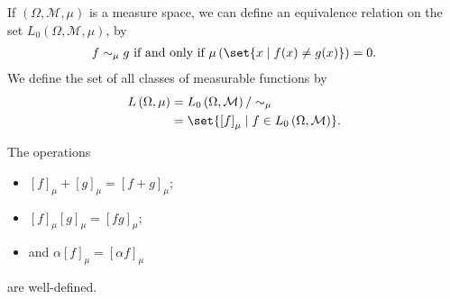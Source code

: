\begin{definition}
  If $\left(\Omega,\mathcal{M},\mu\right)$ is a measure space, we can define an equivalence relation on the set $L_{0}\left(\Omega,\mathcal{M},\mu\right)$, by
  \begin{align*}
    f\sim_{\mu}g \text{ if and only if } \mu\left(\set{x\mid f(x)\neq g(x)}\right) = 0.
  \end{align*}
  We define the set of all classes of measurable functions by
  \begin{align*}
    L\left(\Omega,\mu\right) &= L_{0}\left(\Omega,\mathcal{M}\right)/\sim_{\mu}\\
                             &= \set{\left[f\right]_{\mu}\mid f\in L_{0}\left(\Omega,\mathcal{M}\right)}.
  \end{align*}
\end{definition}
\begin{fact}
  The operations
  \begin{itemize}
    \item $\displaystyle \left[f\right]_{\mu} + \left[g\right]_{\mu} = \left[f + g\right]_{\mu}$;
    \item $\displaystyle \left[f\right]_{\mu}\left[g\right]_{\mu} = \left[fg\right]_{\mu}$;
    \item and $\displaystyle \alpha \left[f\right]_{\mu} = \left[\alpha f\right]_{\mu}$
  \end{itemize}
  are well-defined.
\end{fact}
